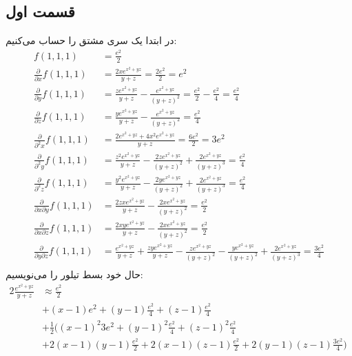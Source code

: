 \documentclass[]{article}
\begin{document}
\subsection*{قسمت اول}
در ابتدا یک سری مشتق را حساب می‌کنیم:
\begin{align*}
    f(1,1,1) &= \frac{e^{2}}{2}\\
    \frac{\partial}{\partial x} f(1,1,1) &= \frac{2xe^{x^2+yz}}{y + z} = \frac{2e^{2}}{2} = e^2\\
    \frac{\partial}{\partial y} f(1,1,1) &= \frac{ze^{x^2+yz}}{y + z} - \frac{e^{x^2+yz}}{(y + z)^2} = \frac{e^{2}}{2} - \frac{e^{2}}{4} = \frac{e^{2}}{4}\\
    \frac{\partial}{\partial z} f(1,1,1) &= \frac{ye^{x^2+yz}}{y + z} - \frac{e^{x^2+yz}}{(y + z)^2} = \frac{e^{2}}{4}\\
    \frac{\partial}{\partial^2 x} f(1,1,1) &= \frac{2e^{x^2+yz}+4x^2e^{x^2+yz}}{y + z} = \frac{6e^2}{2} = 3e^2\\
    \frac{\partial}{\partial^2 y} f(1,1,1) &= \frac{z^{2} e^{x^{2}+y z}}{y +z}-\frac{2 z e^{x^{2}+y z}}{\left(y +z \right)^{2}}+\frac{2 e^{x^{2}+y z}}{\left(y +z \right)^{3}} = \frac{e^{2}}{4}\\
    \frac{\partial}{\partial^2 z} f(1,1,1) &= \frac{y^{2} e^{x^{2}+y z}}{y +z}-\frac{2 y e^{x^{2}+y z}}{\left(y +z \right)^{2}}+\frac{2 e^{x^{2}+y z}}{\left(y +z \right)^{3}} = \frac{e^{2}}{4}\\
    \frac{\partial}{\partial x \partial y} f(1,1,1) &= \frac{2 z x e^{x^{2}+y z}}{y +z}-\frac{2 x e^{x^{2}+y z}}{\left(y +z \right)^{2}} = \frac{e^{2}}{2}\\
    \frac{\partial}{\partial x \partial z} f(1,1,1) &= \frac{2 x y e^{x^{2}+y z}}{y +z}-\frac{2 x e^{x^{2}+y z}}{\left(y +z \right)^{2}} = \frac{e^{2}}{2}\\
    \frac{\partial}{\partial y \partial z} f(1,1,1) &= \frac{e^{x^{2}+y z}}{y +z}+\frac{z y e^{x^{2}+y z}}{y +z}-\frac{z e^{x^{2}+y z}}{\left(y +z \right)^{2}}-\frac{y e^{x^{2}+y z}}{\left(y +z \right)^{2}}+\frac{2 e^{x^{2}+y z}}{\left(y +z \right)^{3}} = \frac{3e^{2}}{4}\\
\end{align*}
حال خود بسط تیلور را می‌نویسیم:
\begin{align*}{2}
    \frac{e^{x^2+yz}}{y + z} &\approx \frac{e^{2}}{2} &&\\
    &+ (x - 1) e^2 + (y - 1) \frac{e^{2}}{4} + (z - 1) \frac{e^{2}}{4}&&\\
    &+ \frac{1}{2} \biggl(\left(x - 1\right)^2 3e^2 + \left(y - 1\right)^2 \frac{e^{2}}{4} + \left(z - 1\right)^2 \frac{e^{2}}{4} \\
    &+ 2\left(x - 1\right)\left(y - 1\right) \frac{e^{2}}{2} + 2\left(x - 1\right)\left(z - 1\right) \frac{e^{2}}{2} + 2\left(y - 1\right)\left(z - 1\right) \frac{3e^{2}}{4}\biggr)\\
\end{align*}
\end{document}
